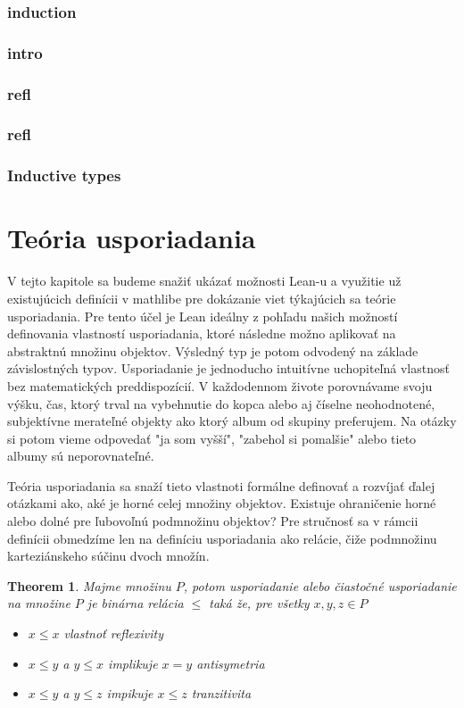 \documentclass[a4paper,10pt,oneside]{report}%
\newtheorem{theorem}{Theorem}
\begin{document}
    \subsubsection{induction}
    \subsubsection{intro}
    \subsubsection{refl}
    \subsubsection{refl}
\subsubsection{Inductive types}

\section{Teória usporiadania}
    V tejto kapitole sa budeme snažiť ukázať možnosti Lean-u a využitie už existujúcich
definícii v mathlibe pre dokázanie viet týkajúcich sa teórie usporiadania.
    Pre tento účel je Lean ideálny z pohľadu našich možností definovania vlastností
usporiadania, ktoré následne možno aplikovať na abstraktnú množinu objektov.
    Výsledný typ je potom odvodený na základe závislostných typov.
    Usporiadanie je jednoducho intuitívne uchopiteľná vlastnosť bez matematických
preddispozícií.
    V každodennom živote porovnávame svoju výšku, čas, ktorý trval na vybehnutie do kopca
alebo aj číselne neohodnotené, subjektívne merateľné objekty ako ktorý album
od skupiny preferujem.
    Na otázky si potom vieme odpovedať "ja som vyšší", "zabehol si pomalšie" alebo
tieto albumy sú neporovnateľné.

Teória usporiadania sa snaží tieto vlastnoti formálne definovať a rozvíjať ďalej
otázkami ako, aké je horné celej množiny objektov. Existuje ohraničenie horné alebo
dolné pre ľubovoľnú podmnožinu objektov?
    Pre stručnosť sa v rámcii definícii obmedzíme len na definíciu usporiadania
ako relácie, čiže podmnožinu karteziánskeho súčinu dvoch množín.

\begin{theorem}
    Majme množinu $P$, potom usporiadanie alebo čiastočné usporiadanie na množine
    $P$ je binárna relácia $\leq$ taká že, pre všetky $x,y,z \in P$
    \begin{itemize}
        \item $x \leq x$ vlastnoť reflexivity
        \item $x \leq y$ a $y \leq x$ implikuje $x = y$ antisymetria
        \item $x \leq y$ a $y \leq z$ impikuje $x \leq z$ tranzitivita
    \end{itemize}
\end{theorem}
\end{document}
